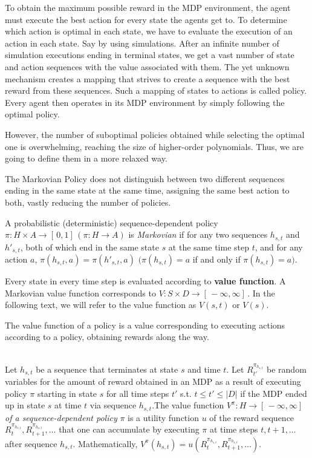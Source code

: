 To obtain the maximum possible reward in the MDP environment, the agent must execute the best action for every state the agents get to. To determine which action is optimal in each state, we have to evaluate the execution of an action in each state. Say by using simulations. After an infinite number of simulation executions ending in terminal states, we get a vast number of state and action sequences with the value associated with them. The yet unknown mechanism creates a mapping that strives to create a sequence with the best reward from these sequences. Such a mapping of states to actions is called policy. Every agent then operates in its MDP environment by simply following the optimal policy. 

However, the number of suboptimal policies obtained while selecting the optimal one is overwhelming, reaching the size of higher-order polynomials. Thus, we are going to define them in a more relaxed way.

The Markovian Policy does not distinguish between two different sequences ending in the same state at the same time, assigning the same best action to both, vastly reducing the number of policies.

\newpage

\begin{definition}
A probabilistic (deterministic) sequence-dependent policy $\pi: H \times A \rightarrow [ \,0, 1] \,(\pi: H \rightarrow A)$ is \textit{Markovian} if for any two sequences $h_{s,t}$ and $h'_{s,t}$, both of which end in the same state $s$ at the same time step $t$, and for any action $a$, 
$\pi(h_{s,t}, a) = \pi(h'_{s,t}, a)$ $(\pi(h_{s,t}) = a$ if and only if $\pi(h_{s,t}) = a)$.
\end{definition}

Every state in every time step is evaluated according to \textbf{value function}. A Markovian value function corresponds to $ V: S \times D 
\rightarrow [ \,-\infty, \infty] \,$. In the following text, we will refer to the value function as $V(s, t)$ or $V(s)$.

The value function of a policy is a value corresponding to executing actions according to a policy, obtaining rewards along the way. \\ \\

\begin{definition}
Let $h_{s,t}$ be a sequence that terminates at state $s$ and time $t$. Let $R^{\pi_{h_{s,t}}}_{t'}$ be random variables for the amount of reward obtained in an MDP as a result of executing policy $\pi$ starting in state $s$ for all time steps $t'$ s.t. $t \leqslant t' \leqslant |D|$ if the MDP ended up in state $s$ at time $t$ via sequence $h_{s,t}$.The value function $V^{\pi}: H \rightarrow [ \,−\infty,\infty] \,$ \textit{of a sequence-dependent policy} $\pi$ is a utility function $u$ of the reward sequence $R^{\pi_{h_{s,t}}}_t, R^{\pi_{h_{s,t}}}_{t+1}, \ldots$ that one can accumulate by executing $\pi$ at time steps $t, t + 1,\ldots$  after sequence $h_{s,t}$. Mathematically, $V^{\pi} (h_{s,t}) = u(R^{\pi_{h_{s,t}}}_t , R^{\pi_{h_{s,t}}}_{t+1}, \ldots)$.
\end{definition}

